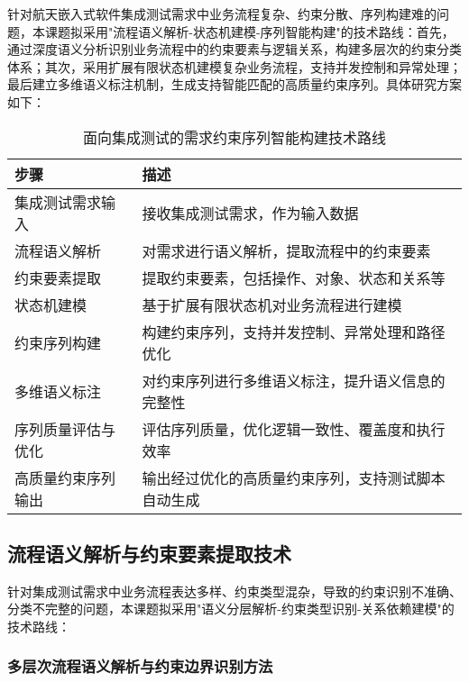 \documentclass[fontset=windows]{article}
\begin{document}
针对航天嵌入式软件集成测试需求中业务流程复杂、约束分散、序列构建难的问题，本课题拟采用"流程语义解析-状态机建模-序列智能构建"的技术路线：首先，通过深度语义分析识别业务流程中的约束要素与逻辑关系，构建多层次的约束分类体系；其次，采用扩展有限状态机建模复杂业务流程，支持并发控制和异常处理；最后建立多维语义标注机制，生成支持智能匹配的高质量约束序列。具体研究方案如下：

\begin{table}[H]
    \centering
    \caption{面向集成测试的需求约束序列智能构建技术路线}
    \label{tab:tech-route}
    \begin{tabular}{|p{4cm}|p{9cm}|}
        \hline
        \textbf{步骤} & \textbf{描述} \\
        \hline
        集成测试需求输入 & 接收集成测试需求，作为输入数据 \\
        \hline
        流程语义解析 & 对需求进行语义解析，提取流程中的约束要素 \\
        \hline
        约束要素提取 & 提取约束要素，包括操作、对象、状态和关系等 \\
        \hline
        状态机建模 & 基于扩展有限状态机对业务流程进行建模 \\
        \hline
        约束序列构建 & 构建约束序列，支持并发控制、异常处理和路径优化 \\
        \hline
        多维语义标注 & 对约束序列进行多维语义标注，提升语义信息的完整性 \\
        \hline
        序列质量评估与优化 & 评估序列质量，优化逻辑一致性、覆盖度和执行效率 \\
        \hline
        高质量约束序列输出 & 输出经过优化的高质量约束序列，支持测试脚本自动生成 \\
        \hline
    \end{tabular}
\end{table}

\subsection{流程语义解析与约束要素提取技术}

针对集成测试需求中业务流程表达多样、约束类型混杂，导致的约束识别不准确、分类不完整的问题，本课题拟采用"语义分层解析-约束类型识别-关系依赖建模"的技术路线：

\subsubsection{多层次流程语义解析与约束边界识别方法}
\end{document}
